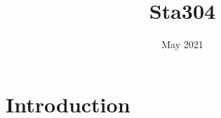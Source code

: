 \documentclass{article}
\title{Sta304}
\date{May 2021}
\begin{document}
\maketitle

\section{Introduction}
\end{document}
